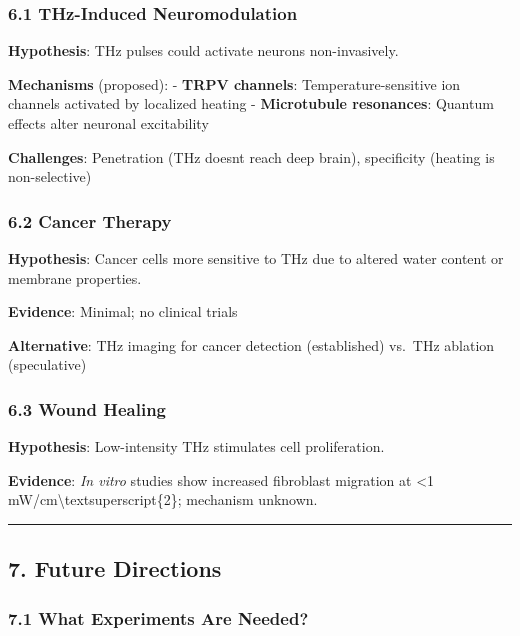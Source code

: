 \subsubsection{6.1 THz-Induced
Neuromodulation}\label{thz-induced-neuromodulation}

\textbf{Hypothesis}: THz pulses could activate neurons non-invasively.

\textbf{Mechanisms} (proposed): - \textbf{TRPV channels}:
Temperature-sensitive ion channels activated by localized heating -
\textbf{Microtubule resonances}: Quantum effects alter neuronal
excitability

\textbf{Challenges}: Penetration (THz doesn\textquotesingle t reach deep
brain), specificity (heating is non-selective)

\subsubsection{6.2 Cancer Therapy}\label{cancer-therapy}

\textbf{Hypothesis}: Cancer cells more sensitive to THz due to altered
water content or membrane properties.

\textbf{Evidence}: Minimal; no clinical trials

\textbf{Alternative}: THz imaging for cancer detection (established)
vs.~THz ablation (speculative)

\subsubsection{6.3 Wound Healing}\label{wound-healing}

\textbf{Hypothesis}: Low-intensity THz stimulates cell proliferation.

\textbf{Evidence}: \emph{In vitro} studies show increased fibroblast
migration at \textless1 mW/cm\textbackslash textsuperscript\{2\};
mechanism unknown.

\begin{center}\rule{0.5\linewidth}{0.5pt}\end{center}

\subsection{7. Future Directions}\label{future-directions}

\subsubsection{7.1 What Experiments Are
Needed?}\label{what-experiments-are-needed}


